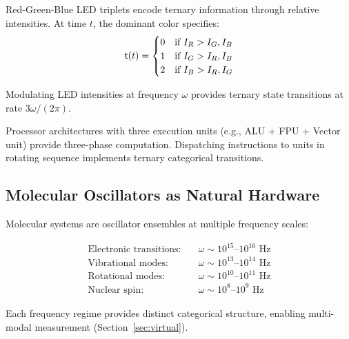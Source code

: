 \begin{example}
\label{ex:rgb_led}
Red-Green-Blue LED triplets encode ternary information through relative intensities. At time $t$, the dominant color specifies:
\begin{equation}
\mathsf{t}(t) = \begin{cases}
0 & \text{if } I_R > I_G, I_B \\
1 & \text{if } I_G > I_R, I_B \\
2 & \text{if } I_B > I_R, I_G
\end{cases}
\end{equation}

Modulating LED intensities at frequency $\omega$ provides ternary state transitions at rate $3\omega/(2\pi)$.
\end{example}

\begin{example}
\label{ex:triple_core}
Processor architectures with three execution units (e.g., ALU + FPU + Vector unit) provide three-phase computation. Dispatching instructions to units in rotating sequence implements ternary categorical transitions.
\end{example}

\subsection{Molecular Oscillators as Natural Hardware}

Molecular systems are oscillator ensembles at multiple frequency scales:

\begin{align}
\text{Electronic transitions:} \quad & \omega \sim 10^{15}\text{--}10^{16} \text{ Hz} \\
\text{Vibrational modes:} \quad & \omega \sim 10^{13}\text{--}10^{14} \text{ Hz} \\
\text{Rotational modes:} \quad & \omega \sim 10^{10}\text{--}10^{11} \text{ Hz} \\
\text{Nuclear spin:} \quad & \omega \sim 10^{8}\text{--}10^{9} \text{ Hz}
\end{align}

Each frequency regime provides distinct categorical structure, enabling multi-modal measurement (Section~\ref{sec:virtual}).

